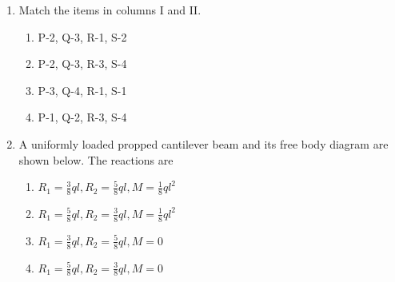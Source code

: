 \documentclass[journal,9pt,onecolumn]{IEEEtran}
\begin{document}
\begin{enumerate}
P:  Shear stress is zero at all points in the flow.

Q:  Velocity is zero at all points in the flow.

R:  Velocity is proportional to the radius from the centre of the vortex.  

S:  Total mechanical energy per unit mass is constant in the entire flow field
\begin{multicols}{4}
\begin{enumerate}
    \item  P and Q                    
    \item R and S
    \item P and R  
    \item P and S
\end{enumerate}
\end{multicols}



\item Match the items in columns I and II.
 \begin{table}[h!]
 	\centering
 	
 	\label{tab:Me-2007}
 \end{table}
\begin{multicols}{4}
\begin{enumerate}
      \item  P-2, Q-3, R-1, S-2
    \item  P-2, Q-3, R-3, S-4
    \item  P-3, Q-4, R-1, S-1
    \item  P-1, Q-2, R-3, S-4
\end{enumerate}
\end{multicols}


\item A uniformly loaded propped cantilever beam and its free body diagram are shown below. The reactions are 
    \begin{center}

    \end{center}
\begin{multicols}{2}
\begin{enumerate}
       \item  $R_1 = \frac{3}{8}ql, R_2 = \frac{5}{8}ql, M = \frac{1}{8}ql^2$
    \item $ R_1 = \frac{5}{8}ql, R_2 = \frac{3}{8}ql, M = \frac{1}{8}ql^2$
    \item  $R_1 = \frac{3}{8}ql, R_2 = \frac{5}{8}ql, M = 0$
    \item  $R_1 = \frac{5}{8}ql, R_2 = \frac{3}{8}ql, M = 0$


\end{enumerate}
\end{multicols}
\end{enumerate}
\end{document}
